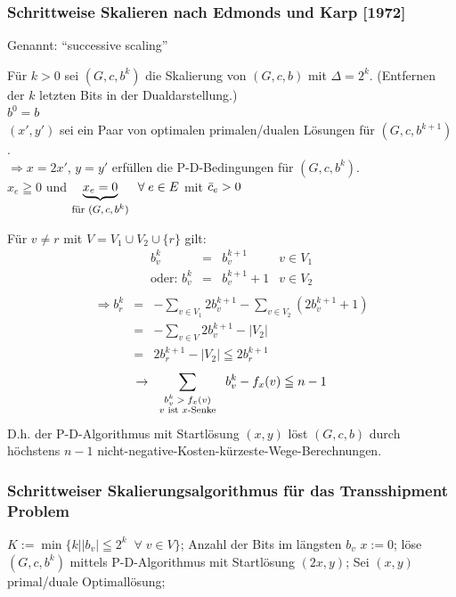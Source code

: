 \subsubsection{Schrittweise Skalieren nach Edmonds und Karp [1972]}

Genannt: "`successive scaling"'

Für $k > 0$ sei $(G,c,b^k)$ die Skalierung von $(G,c,b)$ mit $\Delta =
2^k$. (Entfernen der $k$ letzten Bits in der Dualdarstellung.)\\
$b^0 = b$\\
$(x',y')$ sei ein Paar von optimalen primalen/dualen Lösungen für
$(G,c,b^{k+1})$.\\
$\Rightarrow x = 2x'$, $y=y'$ erfüllen die P-D-Bedingungen für $(G,c,b^k)$.\\
$x_e \geqq 0$ und $\underbrace{x_e=0}_{\mbox{\footnotesize für $(G,c,b^k)$}}
 \; \; \forall \; e \in E$ mit $\bar{c}_e > 0$

Für $v\neq r$ mit $V=V_{1} \cup V_{2} \cup \{r\}$ gilt:
\[\begin{array}{rcll}
b_{v}^k &=&b^{k+1}_v& v \in V_{1}\\
\mbox{oder: }b_{v}^k &=&b_{v}^{k+1} + 1& v\in V_2\\
\end{array}
\]
\[\begin{array}{rcl}
\Rightarrow b_{r}^k &=& - \displaystyle \sum_{v\in V_1} 2b_{v}^{k+1}
-\sum_{v\in V_{2}} (2b^{k+1}_v +1)\\
&=& - \displaystyle \sum_{v\in V} 2b^{k+1}_v - | V_2|\\
&=& 2b^{k+1}_r - |V_2| \leqq 2b^{k+1}_r
\end{array}
\]
\[\rightarrow\sum_{\mbox{\scriptsize\begin{tabular}{cc}$b_{v}^k > f_x(v)$\\$v$ ist
$x$-Senke\end{tabular}}}
b_{v}^k -f_x(v) \leqq n-1\]
D.h. der P-D-Algorithmus mit Startlösung $(x,y)$ löst $(G,c,b)$ durch
höchstens $n-1$ nicht-negative-Kosten-kürzeste-Wege-Berechnungen.

\subsubsection{Schrittweiser Skalierungsalgorithmus für das Transshipment
Problem}
\begin{algorithmic}
\STATE $K := \min \{k | |b_v| \leqq 2^k \; \; \forall \; v \in V\}$; Anzahl
der Bits im längsten $b_v$
\STATE $x:= 0$;
\STATE löse $(G,c,b^k)$ mittels P-D-Algorithmus mit Startlösung $(2x,y)$;
\STATE Sei $(x,y)$ primal/duale Optimallösung;
\ENDFOR
\end{algorithmic}

